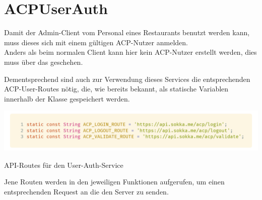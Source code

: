 \section{ACPUserAuth}

Damit der Admin-Client vom Personal eines Restaurants benutzt werden kann, muss dieses sich mit 
einem gültigen ACP-Nutzer anmelden.\\
Anders als beim normalen Client kann hier kein ACP-Nutzer erstellt werden, dies muss über das
 geschehen.

Dementsprechend sind auch zur Verwendung dieses Services die entsprechenden ACP-User-Routes nötig,
die, wie bereits bekannt, als statische Variablen innerhalb der Klasse gespeichert werden.

\begin{code}[H]
    \centering
    \includegraphics[width=1\textwidth]{images/Admin-Client/services/acpuserauth/acproutes.png}
    \vspace{-25pt}
    \caption{API-Routes für den User-Auth-Service}
\end{code}

Jene Routen werden in den jeweiligen Funktionen aufgerufen, um einen entsprechenden Request an
die den Server zu senden.